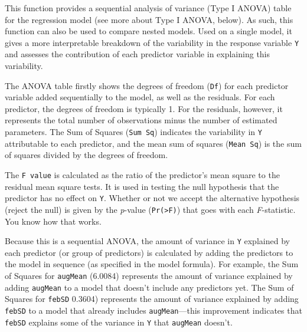\documentclass[
  letterpaper,
]{book}
\begin{document}
This function provides a sequential analysis of variance (Type I ANOVA)
table for the regression model (see more about Type I ANOVA, below). As
such, this function can also be used to compare nested models. Used on a
single model, it gives a more interpretable breakdown of the variability
in the response variable \texttt{Y} and assesses the contribution of
each predictor variable in explaining this variability.

The ANOVA table firstly shows the degrees of freedom (\texttt{Df}) for
each predictor variable added sequentially to the model, as well as the
residuals. For each predictor, the degrees of freedom is typically 1.
For the residuals, however, it represents the total number of
observations minus the number of estimated parameters. The Sum of
Squares (\texttt{Sum\ Sq}) indicates the variability in \texttt{Y}
attributable to each predictor, and the mean sum of squares
(\texttt{Mean\ Sq}) is the sum of squares divided by the degrees of
freedom.

The \texttt{F\ value} is calculated as the ratio of the predictor's mean
square to the residual mean square tests. It is used in testing the null
hypothesis that the predictor has no effect on \texttt{Y}. Whether or
not we accept the alternative hypothesis (reject the null) is given by
the \emph{p}-value (\texttt{Pr(\textgreater{}F)}) that goes with each
\emph{F}-statistic. You know how that works.

Because this is a sequential ANOVA, the amount of variance in \texttt{Y}
explained by each predictor (or group of predictors) is calculated by
adding the predictors to the model in sequence (as specified in the
model formula). For example, the Sum of Squares for \texttt{augMean}
(6.0084) represents the amount of variance explained by adding
\texttt{augMean} to a model that doesn't include any predictors yet. The
Sum of Squares for \texttt{febSD} 0.3604) represents the amount of
variance explained by adding \texttt{febSD} to a model that already
includes \texttt{augMean}---this improvement indicates that
\texttt{febSD} explains some of the variance in \texttt{Y} that
\texttt{augMean} doesn't.
\end{document}
